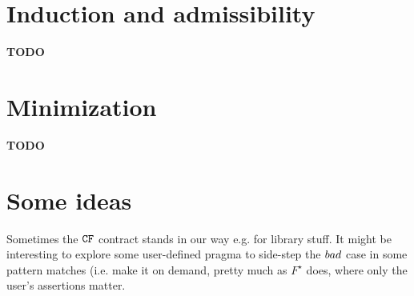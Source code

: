 \documentclass[preprint,nocopyrightspace]{sigplanconf}
\begin{document}



\section{Induction and admissibility}
{\bf TODO} 


\section{Minimization}
{\bf TODO} 

\section{Some ideas}
Sometimes the ${\tt CF}$ contract stands in our way e.g. for library stuff. It might 
be interesting to explore some user-defined pragma to side-step the $\mathop{bad}$ case
in some pattern matches (i.e. make it on demand, pretty much as $F^{\star}$ does, where
only the user's assertions matter.
\end{document}
